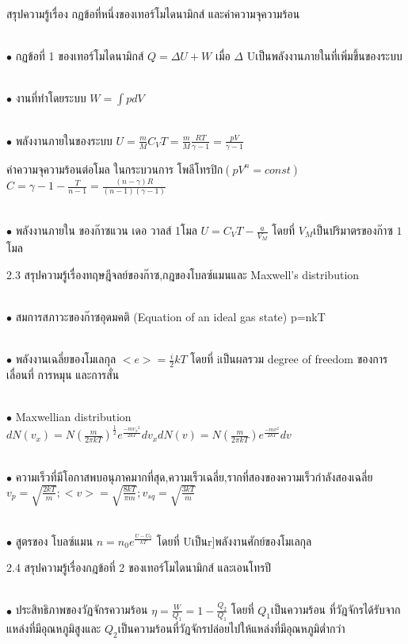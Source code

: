\documentclass[a4paper,12pt]{article}
\begin{document}
 สรุปความรู้เรื่อง กฏข้อที่หนึ่งของเทอร์โมไดนามิกส์ และค่าความจุความร้อน

~\\ $\bullet$  กฏข้อที่ 1 ของเทอร์โมไดนามิกส์
$Q=\Delta U+W$
เมื่อ $\Delta$ Uเป็นพลังงานภายในที่เพิ่มขึ้นของระบบ

~\\ $\bullet$ งานที่ทำโดยระบบ
$W=\int pdV$

~\\ $\bullet$  พลังงานภายในของระบบ
$U=\displaystyle{\frac{m}{M}}C_VT=\displaystyle{\frac{m}{M}}\displaystyle{\frac{RT}{\gamma -1}}=\displaystyle{\frac{pV}{\gamma -1}}$

ค่าความจุความร้อนต่อโมล ในกระบวนการ โพลีโทรปิก$(pV^n=const)$
$C=\displaystyle{{\gamma -1}}-\displaystyle{\frac{T}{n-1}}=\displaystyle{\frac{(n-\gamma)R}{(n-1)(\gamma -1)}}$

~\\ $\bullet$ พลังงานภายใน ของก๊าซแวน เดอ วาลส์ 1โมล
$U=C_VT-\displaystyle{\frac{a}{V_M}}$
โดยที่ $V_M$เป็นปริมาตรของก๊าซ $1$ โมล

2.3 สรุปความรู้เรื่องทฤษฎีจลย์ของก๊าซ,กฎของโบลซ์แมนและ Maxwell's distribution

~\\ $\bullet$ สมการสภาวะของก๊าซอุดมคติ (Equation of an ideal gas state)
p=nkT

~\\ $\bullet$ พลังงานเฉลี่ยของโมเลกุล
$<e>=\displaystyle{\frac{i}{2}}kT$
โดยที่ iเป็นผลรวม degree of freedom ของการเลื่อนที่ การหมุน และการสั่น

~\\ $\bullet$ Maxwellian distribution
$dN(v_x)=N(\displaystyle {\frac{m}{2\pi kT}})^{\frac{1}{2}}e^{\frac{-m{v_x}^2}{2kT}}d{v_x}
dN(v)=N(\displaystyle {\frac{m}{2\pi kT}})e^{\frac{-m{v}^2}{2kT}}d{v}$

~\\ $\bullet$ ความเร็วที่มีโอกาสพบอนุภาคมากที่สุด,ความเร็วเฉลี่ย,รากที่สองของความเร็วกำลังสองเฉลี่ย
$v_p=\sqrt{\displaystyle {\frac{2kT}{m}}}; <v>=\sqrt{\frac{8kT}{\pi m}}; v_{sq}=\sqrt{\frac{3kT}{m}}$

~\\ $\bullet$ สูตรของ โบลซ์แมน
$n=n_0e^{\frac{U-U_0}{kT}}$
โดยที่ Uเป็นr]พลังงานศักย์ของโมเลกุล

2.4 สรุปความรู้เรื่องกฎข้อที่ 2 ของเทอร์โมไดนามิกส์ และเอนโทรปี

~\\ $\bullet$ ประสิทธิภาพของวัฏจักรความร้อน
$\eta=\displaystyle{\frac{W}{Q_1}}=1-\displaystyle{\frac{Q_2}{Q_1}}$
โดยที่ $Q_1$เป็นความร้อน ที่วัฎจักรได้รับจากแหล่งที่มีอุณหภูมิสูงและ $Q_2$เป็นความร้อนที่วัฎจักรปล่อยไปให้แหล่งที่มีอุณหภูมิต่ำกว่า
\end{document}
